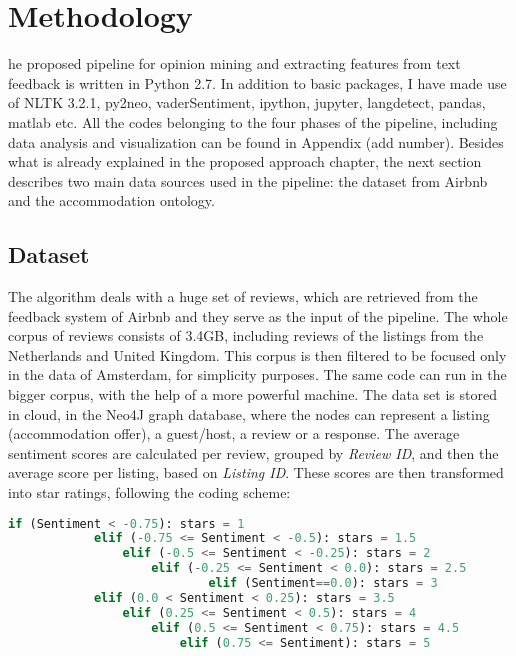%
%
\let\textcircled=\pgftextcircled
\chapter{Methodology}
\label{chap:methods}

 he proposed pipeline for opinion mining and extracting features from text feedback is written in Python 2.7. In addition to basic packages, I have made use of NLTK 3.2.1, py2neo, vaderSentiment, ipython, jupyter, langdetect, pandas, matlab etc. All the codes belonging to the four phases of the pipeline, including data analysis and visualization can be found in Appendix (add number). Besides what is already explained in the proposed approach chapter, the next section describes two main data sources used in the pipeline: the dataset from Airbnb and the accommodation ontology.
\section{Dataset}
%
%
The algorithm deals with a huge set of reviews, which are retrieved from the feedback system of Airbnb and they serve as the input of the pipeline. The whole corpus of reviews consists of 3.4GB, including reviews of the listings from the Netherlands and United Kingdom. This corpus is then filtered to be focused only in the data of Amsterdam, for simplicity purposes. The same code can run in the bigger corpus, with the help of a more powerful machine. The data set is stored in cloud, in the Neo4J graph database, where the nodes can represent a listing (accommodation offer), a guest/host, a review or a response. 
%
%
The average sentiment scores are calculated per review, grouped by \textit{Review ID}, and then the average score per listing, based on \textit{Listing ID}. These scores are then transformed into star ratings, following the coding scheme:

\tiny
\begin{lstlisting}[language=python]
	if (Sentiment < -0.75):	stars = 1
  			elif (-0.75 <= Sentiment < -0.5): stars = 1.5
    			elif (-0.5 <= Sentiment < -0.25): stars = 2
    				elif (-0.25 <= Sentiment < 0.0): stars = 2.5
            				elif (Sentiment==0.0): stars = 3
    		elif (0.0 < Sentiment < 0.25): stars = 3.5
    			elif (0.25 <= Sentiment < 0.5): stars = 4
    				elif (0.5 <= Sentiment < 0.75): stars = 4.5
    					elif (0.75 <= Sentiment): stars = 5
\end{lstlisting}
\normalsize

